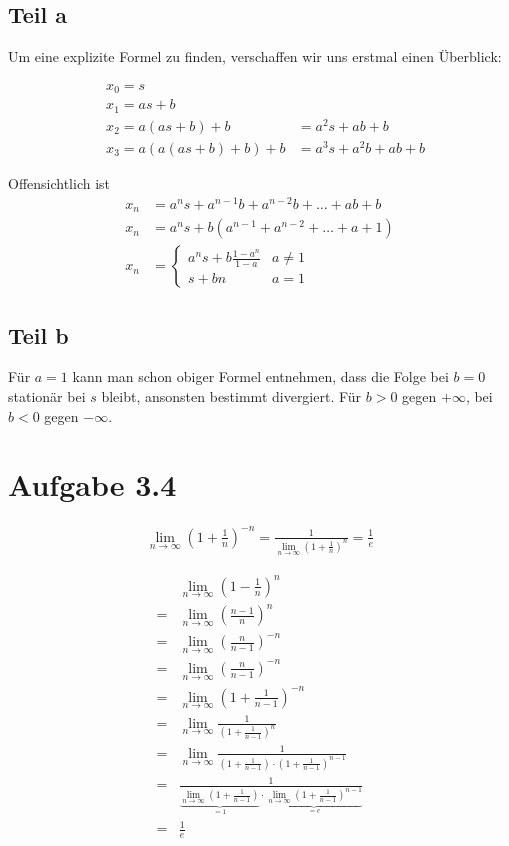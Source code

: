 \documentclass[a4paper,german,12pt,smallheadings]{scrartcl}
\begin{document}
\subsection*{Teil a}

Um eine explizite Formel zu finden, verschaffen wir uns erstmal einen Überblick:

\begin{align*}
  &x_0 = s \\
  &x_1 = as + b \\
  &x_2 = a(as+b) + b    &= a^2s+ab+b\\
  &x_3 = a(a(as+b)+b)+b &= a^3s + a^2b +ab + b
\end{align*}

Offensichtlich ist
\begin{align*}
  x_n &= a^ns + a^{n-1}b + a^{n-2}b + \dots + ab + b \\
  x_n &= a^ns + b(a^{n-1} + a^{n-2} + \dots + a + 1) \\
  x_n &= \left\{\begin{array}{ll} a^ns + b \frac{1-a^n}{1-a} & a \neq 1 \\
         s + bn & a = 1\end{array}\right.
\end{align*}

\subsection*{Teil b}
Für $a=1$ kann man schon obiger Formel entnehmen, dass die Folge bei $b=0$
stationär bei $s$ bleibt, ansonsten bestimmt divergiert. Für $b > 0$ gegen
$+\infty$, bei $b<0$ gegen $-\infty$.

\section*{Aufgabe 3.4}

\begin{align*}
  \lim_{n \to \infty} \left(1+ \frac{1}{n}\right)^{-n} = \frac{1}{\lim_{n \to \infty} \left(1+ \frac{1}{n}\right)^{n}} = \frac{1}{e}
\end{align*}

\begin{align*}
  &\lim_{n \to \infty} \left(1-\frac{1}{n}\right)^n \\
  = &\lim_{n \to \infty} \left(\frac{n-1}{n}\right)^n \\
  = &\lim_{n \to \infty} \left(\frac{n}{n-1}\right)^{-n} \\
  = &\lim_{n \to \infty} \left(\frac{n}{n-1}\right)^{-n} \\
  = &\lim_{n \to \infty} \left(1+\frac{1}{n-1}\right)^{-n} \\
  = &\lim_{n \to \infty} \frac{1}{\left(1+\frac{1}{n-1}\right)^{n}} \\
  = &\lim_{n \to \infty} \frac{1}{\left(1+\frac{1}{n-1}\right) \cdot \left(1+\frac{1}{n-1}\right)^{n-1}} \\
  = &\frac{1}{\underbrace{\lim_{n \to \infty}\left(1+\frac{1}{n-1}\right)}_{= 1} \cdot \underbrace{\lim_{n \to \infty} \left(1+\frac{1}{n-1}\right)^{n-1}}_{= e}} \\
  = &\frac{1}{e}
\end{align*}
\end{document}
